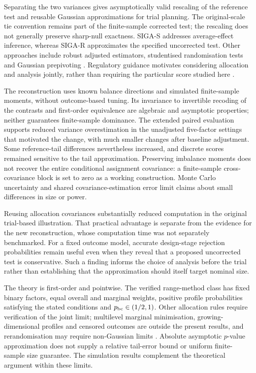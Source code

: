 \documentclass[12pt,a4paper]{article}
\theoremstyle{definition}
\begin{document}
Separating the two variances gives asymptotically valid rescaling of the reference test and reusable Gaussian approximations for trial planning. The original-scale tie convention remains part of the finite-sample corrected test; the rescaling does not generally preserve sharp-null exactness. SIGA-S addresses average-effect inference, whereas SIGA-R approximates the specified uncorrected test. Other approaches include robust adjusted estimators, studentised randomisation tests and Gaussian prepivoting \citep{YeEtAl2023,WuDing2021,ZhaoDing2021,CohenFogarty2022}. Regulatory guidance motivates considering allocation and analysis jointly, rather than requiring the particular score studied here \citep{FDA2019Adaptive,FDA2023Covariates,NMPA2022Randomization}.

The reconstruction uses known balance directions and simulated finite-sample moments, without outcome-based tuning. Its invariance to invertible recoding of the contrasts and first-order equivalence are algebraic and asymptotic properties; neither guarantees finite-sample dominance. The extended paired evaluation supports reduced variance overestimation in the unadjusted five-factor settings that motivated the change, with much smaller changes after baseline adjustment. Some reference-tail differences nevertheless increased, and discrete scores remained sensitive to the tail approximation. Preserving imbalance moments does not recover the entire conditional assignment covariance: a finite-sample cross-covariance block is set to zero as a working construction. Monte Carlo uncertainty and shared covariance-estimation error limit claims about small differences in size or power.

Reusing allocation covariances substantially reduced computation in the original trial-based illustration. That practical advantage is separate from the evidence for the new reconstruction, whose computation time was not separately benchmarked. For a fixed outcome model, accurate design-stage rejection probabilities remain useful even when they reveal that a proposed uncorrected test is conservative. Such a finding informs the choice of analysis before the trial rather than establishing that the approximation should itself target nominal size.

The theory is first-order and pointwise. The verified range-method class has fixed binary factors, equal overall and marginal weights, positive profile probabilities satisfying the stated conditions and $p_{\rm bc}\in(1/2,1)$. Other allocation rules require verification of the joint limit; multilevel marginal minimisation, growing-dimensional profiles and censored outcomes are outside the present results, and rerandomisation may require non-Gaussian limits \citep{LiDing2020,WangLi2026}. Absolute asymptotic $p$-value approximation does not supply a relative tail-error bound or uniform finite-sample size guarantee. The simulation results complement the theoretical argument within these limits.
\end{document}
